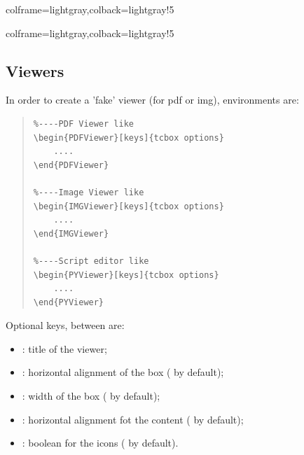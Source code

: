 \documentclass[11pt,a4paper]{ltxdoc}
\begin{document}
\begin{tcblisting}{colframe=lightgray,colback=lightgray!5}
\end{tcblisting}

\begin{tcblisting}{colframe=lightgray,colback=lightgray!5}
\end{tcblisting}

\pagebreak

\subsection{Viewers}

In order to create a 'fake' viewer (for \textsf{pdf} or \textsf{img}), environments are:

\begin{quote}
\begin{verbatim}
%----PDF Viewer like
\begin{PDFViewer}[keys]{tcbox options}
    ....
\end{PDFViewer}

%----Image Viewer like
\begin{IMGViewer}[keys]{tcbox options}
    ....
\end{IMGViewer}

%----Script editor like
\begin{PYViewer}[keys]{tcbox options}
    ....
\end{PYViewer}
\end{verbatim}
\end{quote}

Optional keys, between \MontreCode{[...]} are:

\begin{itemize}
	\item {}: title of the viewer;
	\item {}: horizontal alignment of the box ( by default);
	\item {}: width of the box ( by default);
	\item {}: horizontal alignment fot the content ( by default);
	\item {}: boolean for the icons ( by default).
\end{itemize}
\end{document}
